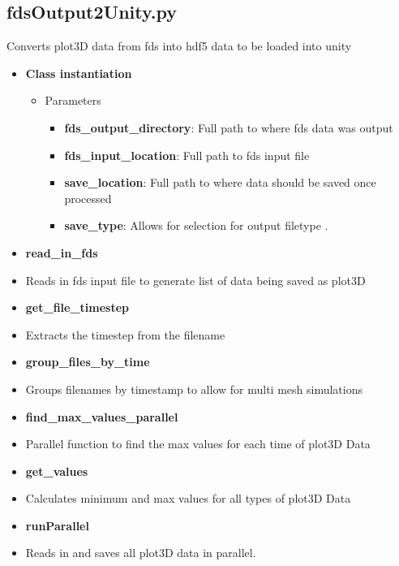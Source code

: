 \subsection{fdsOutput2Unity.py}
\label{PythonOutput2Unity}
Converts plot3D data from fds into hdf5 data to be loaded into unity
\begin{itemize}
    \item \textbf{Class instantiation}
    \begin{itemize}    
    \item Parameters   
        \begin{itemize}
        \item\textbf{fds\_output\_directory}:  Full path to where fds data was output
        \item\textbf{fds\_input\_location}:  Full path to fds input file
        \item\textbf{save\_location}: Full path to where data should be saved once processed
        \item\textbf{save\_type}: Allows for selection for output filetype
.
        \end{itemize} 
    \end{itemize}
    
    \item \textbf{read\_in\_fds}
    \item[] Reads in fds input file to generate list of data being saved as plot3D 
    
    \item \textbf{get\_file\_timestep}
    \item[] Extracts the timestep from the filename
      
    \item \textbf{group\_files\_by\_time}
    \item[]  Groups filenames by timestamp to allow for multi mesh simulations
    
    \item \textbf{find\_max\_values\_parallel}
    \item[] Parallel function to find the max values for each time of plot3D Data

    \item \textbf{get\_values}
    \item[] Calculates minimum and max values for all types of plot3D Data


    \item \textbf{runParallel}
    \item[] Reads in and saves all plot3D data in parallel.


\end{itemize}
